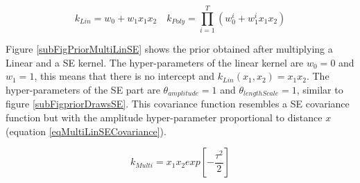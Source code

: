 \begin{equation}\label{eqCh4PolynomialCovariance}
k_{Lin} = w_{0} + w_{1}x_{1}x_{2} \quad k_{Poly} = \prod_{i=1}^{T} \left (w_{0}^{i} + w_{1}^{i}x_{1}x_{2} \right)
\end{equation}

Figure \ref{subFigPriorMultiLinSE} shows the prior obtained after multiplying a Linear and a SE kernel. The hyper-parameters of the linear kernel are $w_{0}=0$ and $w_{1}=1$, this means that there is no intercept and $k_{Lin}(x_{1}, x_{2}) = x_{1}x_{2}$. The hyper-parameters of the SE part are $\theta_{amplitude}=1$ and $\theta_{lengthScale}=1$, similar to figure \ref{subFigpriorDrawsSE}. This covariance function resembles a SE covariance function but with the amplitude hyper-parameter proportional to distance \(x\) (equation \ref{eqMultiLinSECovariance}). 

\begin{equation}\label{eqMultiLinSECovariance}
k_{Multi} = x_{1}x_{2} exp[- \frac{\tau^2}{2}]
\end{equation}

